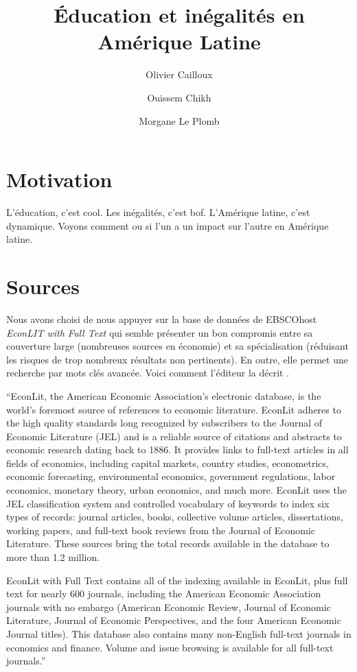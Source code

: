 \documentclass[pagesize, twoside=off, bibliography=totoc, DIV=calc, fontsize=12pt, a4paper, french]{scrartcl}
\title{Éducation et inégalités en Amérique Latine}
\author{Olivier Cailloux}
\author{Ouissem Chikh}
\author{Morgane Le Plomb}
\affil{Université Paris-Dauphine, PSL Research University, CNRS, LAMSADE, 75016 PARIS, FRANCE}
\begin{document}
\maketitle

\section{Motivation}
\label{sec:motiv}
L’éducation, c’est cool.
Les inégalités, c’est bof.
L’Amérique latine, c’est dynamique.
Voyons comment ou si l’un a un impact sur l’autre en Amérique latine.

\section{Sources}
Nous avons choisi de nous appuyer sur la base de données de EBSCOhost \emph{EconLIT with Full Text} qui semble présenter un bon compromis entre sa couverture large (nombreuses sources en économie) et sa spécialisation (réduisant les risques de trop nombreux résultats non pertinents). En outre, elle permet une recherche par mots clés avancée.
Voici comment l’éditeur la décrit \citep{ebscohost_econlit_2024}.

“EconLit, the American Economic Association's electronic database, is the world's foremost source of references to economic literature. EconLit adheres to the high quality standards long recognized by subscribers to the Journal of Economic Literature (JEL) and is a reliable source of citations and abstracts to economic research dating back to 1886. It provides links to full-text articles in all fields of economics, including capital markets, country studies, econometrics, economic forecasting, environmental economics, government regulations, labor economics, monetary theory, urban economics, and much more. EconLit uses the JEL classification system and controlled vocabulary of keywords to index six types of records: journal articles, books, collective volume articles, dissertations, working papers, and full-text book reviews from the Journal of Economic Literature. These sources bring the total records available in the database to more than 1.2 million.

EconLit with Full Text contains all of the indexing available in EconLit, plus full text for nearly 600 journals, including the American Economic Association journals with no embargo (American Economic Review, Journal of Economic Literature, Journal of Economic Perspectives, and the four American Economic Journal titles). This database also contains many non-English full-text journals in economics and finance. Volume and issue browsing is available for all full-text journals.”
\end{document}

